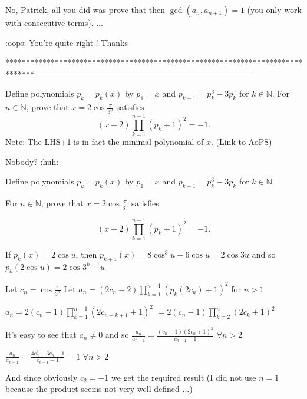 \begin{solution}
	\begin{tcolorbox}No, Patrick, all you did was prove that then $\gcd(a_n,a_{n+1}) = 1$ (you only work with consecutive terms). ...\end{tcolorbox}
:oops: You're quite right !
Thanks
\end{solution}
*******************************************************************************
-------------------------------------------------------------------------------

\begin{problem}
	Define polynomials $p_k=p_k(x)$ by $p_1=x$ and $p_{k+1}=p_k^3-3p_k$ for $k\in\mathbb N$. For $n\in\mathbb N$, prove that $x=2\cos\frac{\pi}{3^n}$ satisfies
\[(x-2)\prod_{k=1}^{n-1}(p_k+1)^2=-1.\]
Note: The LHS+1 is in fact the minimal polynomial of $x$.
	\flushright \href{https://artofproblemsolving.com/community/c6h412851}{(Link to AoPS)}
\end{problem}



\begin{solution}
	Nobody?      :huh:
\end{solution}



\begin{solution}
	\begin{tcolorbox}Define polynomials $p_k=p_k(x)$ by $p_1=x$ and $p_{k+1}=p_k^3-3p_k$ for $k\in\mathbb N$.

For $n\in\mathbb N$, prove that $x=2\cos\frac{\pi}{3^n}$ satisfies

\[(x-2)\prod_{k=1}^{n-1}(p_k+1)^2=-1.\]\end{tcolorbox}
If $p_k(x)=2\cos u$, then $p_{k+1}(x)=8\cos^3 u-6\cos u=2\cos 3u$ and so $p_k(2\cos u)=2\cos 3^{k-1}u$

Let $c_n=\cos\frac{\pi}{3^n}$
Let $a_n=(2c_n-2)\prod_{k=1}^{n-1}(p_k(2c_n)+1)^2$ for $n>1$

$a_n=2(c_n-1)\prod_{k=1}^{n-1}(2c_{n-k+1}+1)^2$ $=2(c_n-1)\prod_{k=2}^{n}(2c_{k}+1)^2$

It's easy to see that $a_n\ne 0$ and so $\frac{a_{n}}{a_{n-1}}=\frac{(c_n-1)(2c_n+1)^2}{c_{n-1}-1}$  $\forall n>2$

$\frac{a_{n}}{a_{n-1}}=\frac{4c_n^3-3c_n-1}{c_{n-1}-1}=1$  $\forall n>2$

And since obviously $c_2=-1$ we get the required result (I did not use $n=1$ because the product seems not very well defined ...)
\end{solution}



